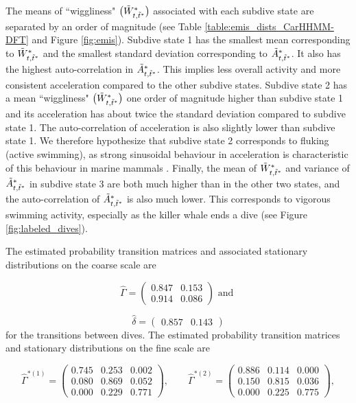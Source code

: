 The means of ``wiggliness" $\big(\tilde{W}^*_{t,\tilde t^*}\big)$ associated with each subdive state are separated by an order of magnitude (see Table \ref{table:emis_dists_CarHHMM-DFT} and Figure \ref{fig:emis}). 
Subdive state 1 has the smallest mean corresponding to $\tilde{W}^*_{t,\tilde t^*}$ and the smallest standard deviation corresponding to $\tilde{A}^*_{t,\tilde t^*}$. It also has the highest auto-correlation in $\tilde{A}^*_{t,\tilde t^*}$. This implies less overall activity and more consistent acceleration compared to the other subdive states. 
Subdive state 2 has a mean ``wiggliness" $\big(\tilde{W}^*_{t,\tilde t^*}\big)$ one order of magnitude higher than subdive state 1 and its acceleration has about twice the standard deviation compared to subdive state 1. The auto-correlation of acceleration is also slightly lower than subdive state 1. We therefore hypothesize that subdive state 2 corresponds to fluking (active swimming), as strong sinusoidal behaviour in acceleration is characteristic of this behaviour in marine mammals \citep{Simon:2012}.
Finally, the mean of $\tilde{W}^*_{t,\tilde t^*}$ and variance of $\tilde{A}^*_{t,\tilde t^*}$ in subdive state 3 are both much higher than in the other two states, and the auto-correlation of $\tilde{A}^*_{t,\tilde t^*}$ is also much lower. This corresponds to vigorous swimming activity, especially as the killer whale ends a dive (see Figure \ref{fig:labeled_dives}). 

The estimated probability transition matrices and associated stationary distributions on the coarse scale are

\[\hat \Gamma = \begin{pmatrix} 
0.847 & 0.153 \\
0.914 & 0.086
\end{pmatrix} \text{ and }\]

\[\hat \delta = \begin{pmatrix} 0.857 & 0.143 \end{pmatrix}\]
%
for the transitions between dives. The estimated probability transition matrices and stationary distributions on the fine scale are 

\[\hat \Gamma^{*(1)} = \begin{pmatrix} 
0.745 & 0.253 & 0.002 \\
0.080 & 0.869 & 0.052 \\
0.000 & 0.229 & 0.771
\end{pmatrix}, \qquad 
\hat \Gamma^{*(2)} = \begin{pmatrix} 
0.886 & 0.114 & 0.000 \\
0.150 & 0.815 & 0.036 \\
0.000 & 0.225 & 0.775
\end{pmatrix},\]

